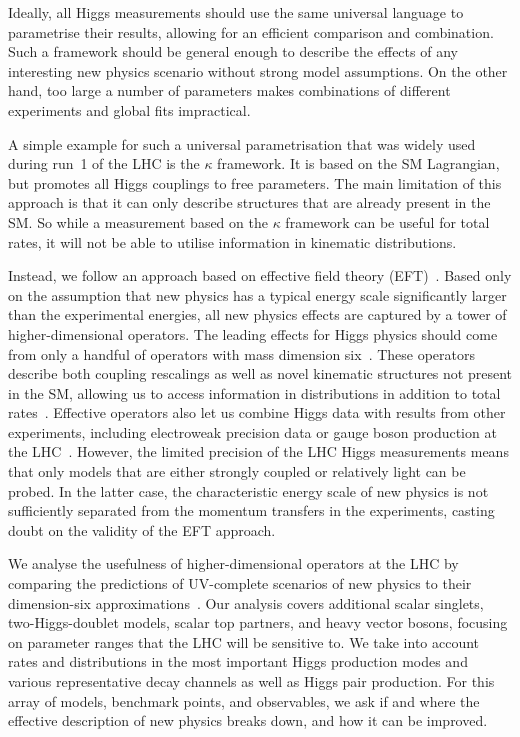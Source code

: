 \newparagraph
%
Ideally, all Higgs measurements should use the same universal language
to parametrise their results, allowing for an efficient comparison
and combination. Such a framework should be general enough to describe
the effects of any interesting new physics scenario without strong model
assumptions. On the other hand, too large a number of parameters makes
combinations of different experiments and global fits impractical.

A simple example for such a universal parametrisation that was widely
used during run~1 of the LHC is the $\kappa$ framework. It is based on
the SM Lagrangian, but promotes all Higgs couplings to free
parameters. The main limitation of this approach is that it can only
describe structures that are already present in the SM. So while a
measurement based on the $\kappa$ framework can be useful for total
rates, it will not be able to utilise information in kinematic
distributions.

Instead, we follow an approach based on effective field theory
(EFT)~\cite{Coleman:1969sm, Callan:1969sn, Weinberg:1980wa}. Based
only on the assumption that new physics has a typical energy scale
significantly larger than the experimental energies, all new physics
effects are captured by a tower of higher-dimensional operators. The
leading effects for Higgs physics should come from only a handful of
operators with mass dimension six~\cite{Burges:1983zg, Leung:1984ni,
  Buchmuller:1985jz}. These operators
%
%
describe both coupling rescalings as well as novel kinematic
structures not present in the SM, allowing us to access information in
distributions in addition to total rates~\cite{Corbett:2012ja,
  Corbett:2015ksa}. Effective operators also let us combine Higgs data
with results from other experiments, including electroweak precision
data or gauge boson production at the
LHC~\cite{Butter:2016cvz}. However, the limited precision of the LHC
Higgs measurements means that only models that are either strongly
coupled or relatively light can be probed. In the latter case, the
characteristic energy scale of new physics is not sufficiently
separated from the momentum transfers in the experiments, casting
doubt on the validity of the EFT approach.

We analyse the usefulness of higher-dimensional operators at the LHC
by comparing the predictions of UV-complete scenarios of new physics
to their dimension-six approximations~\cite{Brehmer:2015rna}. Our
analysis covers additional scalar singlets, two-Higgs-doublet models,
scalar top partners, and heavy vector bosons, focusing on parameter
ranges that the LHC will be sensitive to. We take into account rates
and distributions in the most important Higgs production modes and
various representative decay channels as well as Higgs pair
production. For this array of models, benchmark points, and
observables, we ask if and where the effective description of new
physics breaks down, and how it can be improved.

